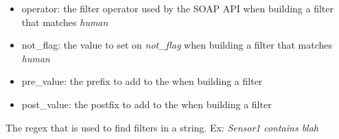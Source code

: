 \documentclass[letterpaper,10pt,english]{sphinxmanual}
\begin{document}
\begin{fulllineitems}
\begin{description}
\begin{itemize}
\item {} 
operator: the filter operator used by the SOAP API when building a filter that matches \emph{human}

\item {} 
not\_flag: the value to set on \emph{not\_flag} when building a filter that matches \emph{human}

\item {} 
pre\_value: the prefix to add to the  when building a filter

\item {} 
post\_value: the postfix to add to the  when building a filter

\end{itemize}

\end{description}

\end{fulllineitems}


\begin{fulllineitems}
\label{pytan.constants:pytan.constants.FILTER_RE}
The regex that is used to find filters in a string. Ex: \emph{Sensor1} \emph{contains blah}

\end{fulllineitems}

\end{document}
